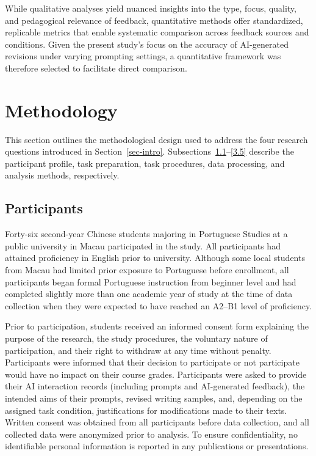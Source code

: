 \documentclass[english]{textolivre}
\begin{document}
While qualitative analyses yield nuanced insights into the type, focus, quality, and pedagogical relevance of feedback, quantitative methods offer standardized, replicable metrics that enable systematic comparison across feedback sources and conditions. Given the present study’s focus on the accuracy of AI-generated revisions under varying prompting settings, a quantitative framework was therefore selected to facilitate direct comparison.

\section{Methodology}\label{sec3}

This section outlines the methodological design used to address the four research questions introduced in Section~\ref{sec-intro}. Subsections~\ref{3.1}–\ref{3.5} describe the participant profile, task preparation, task procedures, data processing, and analysis methods, respectively.


\subsection{Participants}\label{3.1}


Forty-six second-year Chinese students majoring in Portuguese Studies at a public university in Macau participated in the study. All participants had attained proficiency in English prior to university. Although some local students from Macau had limited prior exposure to Portuguese before enrollment, all participants began formal Portuguese instruction from beginner level and had completed slightly more than one academic year of study at the time of data collection when they were expected to have reached an A2--B1 level of proficiency. 

Prior to participation, students received an informed consent form explaining the purpose of the research, the study procedures, the voluntary nature of participation, and their right to withdraw at any time without penalty. Participants were informed that their decision to participate or not participate would have no impact on their course grades. Participants were asked to provide their AI interaction records (including prompts and AI-generated feedback), the intended aims of their prompts, revised writing samples, and, depending on the assigned task condition, justifications for modifications made to their texts. Written consent was obtained from all participants before data collection, and all collected data were anonymized prior to analysis. To ensure confidentiality, no identifiable personal information is reported in any publications or presentations. 
\end{document}
